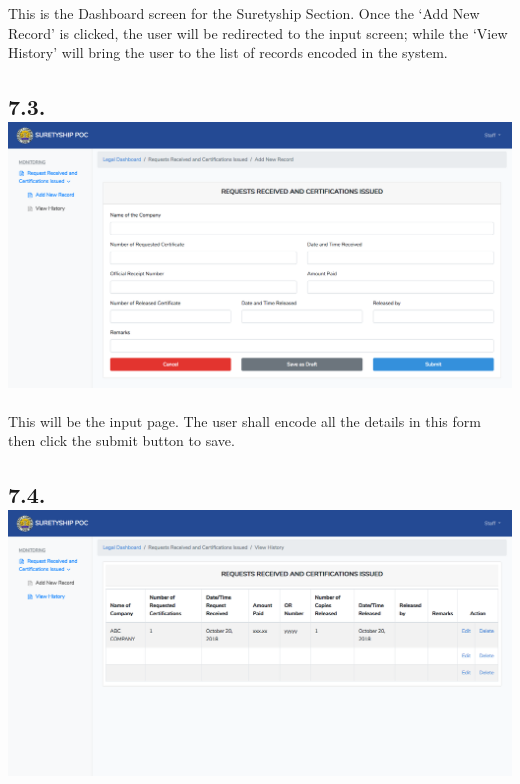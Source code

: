 \documentclass{article}
\begin{document}
\noindent{}This is the Dashboard screen for the Suretyship
Section. Once the ‘Add New Record’ is clicked, the user will be
redirected to the input screen; while the ‘View History’ will bring the
user to the list of records encoded in the system.%

\subsection{7.3.\hspace*{0.5em}\includegraphics[keepaspectratio=true]{up-ic-screens/image172}{}}\label{sec-up-ic-screensimage172png}%

\noindent{}This will be the input page. The user shall encode all
the details in this form then click the submit button to save.%

\subsection{7.4.\hspace*{0.5em}\includegraphics[keepaspectratio=true]{up-ic-screens/image50}{}}\label{sec-up-ic-screensimage50png}%
\end{document}
